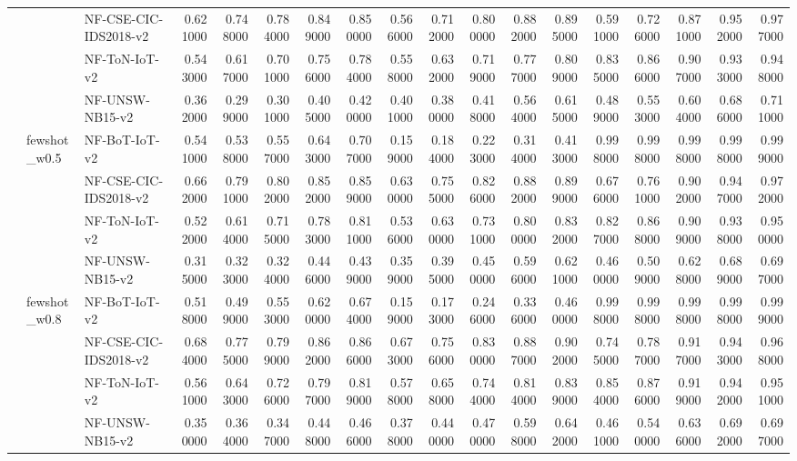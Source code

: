 \begin{tabular}{lllrrrrrrrrrrrrrrr}
 &  & NF-CSE-CIC-IDS2018-v2 & 0.621000 & 0.748000 & 0.784000 & 0.849000 & 0.850000 & 0.566000 & 0.712000 & 0.800000 & 0.882000 & 0.895000 & 0.591000 & 0.726000 & 0.871000 & 0.952000 & 0.977000 \\
 &  & NF-ToN-IoT-v2 & 0.543000 & 0.617000 & 0.701000 & 0.756000 & 0.784000 & 0.558000 & 0.632000 & 0.719000 & 0.777000 & 0.809000 & 0.835000 & 0.866000 & 0.907000 & 0.933000 & 0.948000 \\
 &  & NF-UNSW-NB15-v2 & 0.362000 & 0.299000 & 0.301000 & 0.405000 & 0.420000 & 0.401000 & 0.380000 & 0.418000 & 0.564000 & 0.615000 & 0.489000 & 0.553000 & 0.604000 & 0.686000 & 0.711000 \\
\cline{2-18}
 & \multirow[t]{4}{*}{fewshot_w0.5} & NF-BoT-IoT-v2 & 0.541000 & 0.538000 & 0.557000 & 0.643000 & 0.707000 & 0.159000 & 0.184000 & 0.223000 & 0.314000 & 0.413000 & 0.998000 & 0.998000 & 0.998000 & 0.998000 & 0.999000 \\
 &  & NF-CSE-CIC-IDS2018-v2 & 0.662000 & 0.791000 & 0.802000 & 0.852000 & 0.859000 & 0.630000 & 0.755000 & 0.826000 & 0.882000 & 0.899000 & 0.676000 & 0.761000 & 0.902000 & 0.947000 & 0.972000 \\
 &  & NF-ToN-IoT-v2 & 0.522000 & 0.614000 & 0.715000 & 0.783000 & 0.811000 & 0.536000 & 0.630000 & 0.731000 & 0.800000 & 0.832000 & 0.827000 & 0.868000 & 0.909000 & 0.938000 & 0.950000 \\
 &  & NF-UNSW-NB15-v2 & 0.315000 & 0.323000 & 0.324000 & 0.446000 & 0.439000 & 0.359000 & 0.395000 & 0.450000 & 0.596000 & 0.621000 & 0.460000 & 0.509000 & 0.628000 & 0.689000 & 0.697000 \\
\cline{2-18}
 & \multirow[t]{4}{*}{fewshot_w0.8} & NF-BoT-IoT-v2 & 0.518000 & 0.499000 & 0.553000 & 0.620000 & 0.674000 & 0.159000 & 0.173000 & 0.246000 & 0.336000 & 0.460000 & 0.998000 & 0.998000 & 0.998000 & 0.998000 & 0.999000 \\
 &  & NF-CSE-CIC-IDS2018-v2 & 0.684000 & 0.775000 & 0.799000 & 0.862000 & 0.866000 & 0.673000 & 0.756000 & 0.830000 & 0.887000 & 0.902000 & 0.745000 & 0.787000 & 0.917000 & 0.943000 & 0.968000 \\
 &  & NF-ToN-IoT-v2 & 0.561000 & 0.643000 & 0.726000 & 0.797000 & 0.819000 & 0.578000 & 0.658000 & 0.744000 & 0.814000 & 0.839000 & 0.854000 & 0.876000 & 0.919000 & 0.942000 & 0.951000 \\
 &  & NF-UNSW-NB15-v2 & 0.350000 & 0.364000 & 0.347000 & 0.448000 & 0.466000 & 0.378000 & 0.440000 & 0.470000 & 0.598000 & 0.642000 & 0.461000 & 0.540000 & 0.636000 & 0.692000 & 0.697000 \\

\end{tabular}
